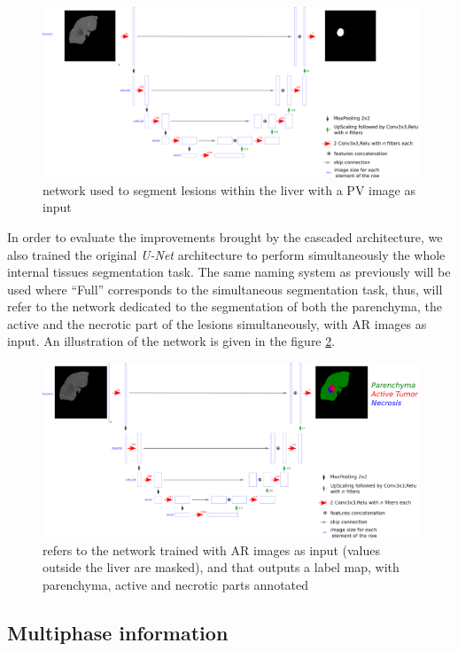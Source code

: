 \begin{figure}[th!]
	\centering
	\includegraphics[width=0.9\linewidth]{images/PV_Lesion}
	\caption{ network used to segment lesions within the liver with a PV image as input}
	\label{CARS_PV_lesion_Fig}
\end{figure}


In order to evaluate the improvements brought by the cascaded
architecture, we also trained the original \emph{U-Net} architecture to
perform simultaneously the whole internal tissues segmentation task. The
same naming system as previously will be used where ``Full'' corresponds
to the simultaneous segmentation task, thus,  will refer to the
network dedicated to the segmentation of both the parenchyma, the active
and the necrotic part of the lesions simultaneously, with AR
images as input. An illustration of the network is given in the figure
\ref{CARS_ArFull_Fig}.

\begin{figure}[th!]
	\centering
	\includegraphics[width=0.9\linewidth]{images/image23}
	\caption{ refers to the network trained with AR images as input (values outside the liver are masked), and that outputs a label map, with parenchyma, active and necrotic parts annotated}
	\label{CARS_ArFull_Fig}
\end{figure}


\subsection{Multiphase information}

